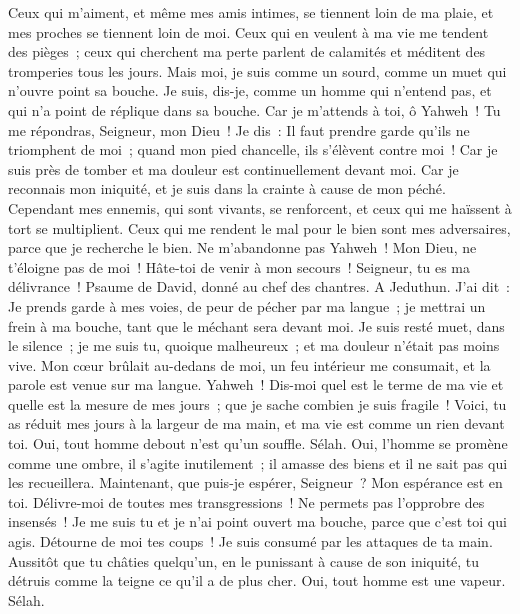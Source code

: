 \begin{multicols}{2}
Ceux qui m'aiment, et même mes amis intimes, se tiennent loin de ma plaie, et mes proches se tiennent loin de moi.
Ceux qui en veulent à ma vie me tendent des pièges~; ceux qui cherchent ma perte parlent de calamités et méditent des tromperies tous les jours.
Mais moi, je suis comme un sourd, comme un muet qui n'ouvre point sa bouche.
Je suis, dis-je, comme un homme qui n'entend pas, et qui n'a point de réplique dans sa bouche.
Car je m'attends à toi, ô Yahweh~! Tu me répondras, Seigneur, mon Dieu~!
Je dis~: Il faut prendre garde qu'ils ne triomphent de moi~; quand mon pied chancelle, ils s'élèvent contre moi~!
Car je suis près de tomber et ma douleur est continuellement devant moi.
Car je reconnais mon iniquité, et je suis dans la crainte à cause de mon péché.
Cependant mes ennemis, qui sont vivants, se renforcent, et ceux qui me haïssent à tort se multiplient.
Ceux qui me rendent le mal pour le bien sont mes adversaires, parce que je recherche le bien.
Ne m'abandonne pas Yahweh~! Mon Dieu, ne t'éloigne pas de moi~!
Hâte-toi de venir à mon secours~! Seigneur, tu es ma délivrance~!
\VerseOne{}Psaume de David, donné au chef des chantres. A Jeduthun.
J'ai dit~: Je prends garde à mes voies, de peur de pécher par ma langue~; je mettrai un frein à ma bouche, tant que le méchant sera devant moi.
Je suis resté muet, dans le silence~; je me suis tu, quoique malheureux~; et ma douleur n'était pas moins vive.
Mon cœur brûlait au-dedans de moi, un feu intérieur me consumait, et la parole est venue sur ma langue.
Yahweh~! Dis-moi quel est le terme de ma vie et quelle est la mesure de mes jours~; que je sache combien je suis fragile~!
Voici, tu as réduit mes jours à la largeur de ma main, et ma vie est comme un rien devant toi. Oui, tout homme debout n'est qu'un souffle. Sélah.
Oui, l'homme se promène comme une ombre, il s'agite inutilement~; il amasse des biens et il ne sait pas qui les recueillera.
Maintenant, que puis-je espérer, Seigneur~? Mon espérance est en toi.
Délivre-moi de toutes mes transgressions~! Ne permets pas l'opprobre des insensés~!
Je me suis tu et je n'ai point ouvert ma bouche, parce que c'est toi qui agis.
Détourne de moi tes coups~! Je suis consumé par les attaques de ta main.
Aussitôt que tu châties quelqu'un, en le punissant à cause de son iniquité, tu détruis comme la teigne ce qu'il a de plus cher. Oui, tout homme est une vapeur. Sélah.

\end{multicols}
